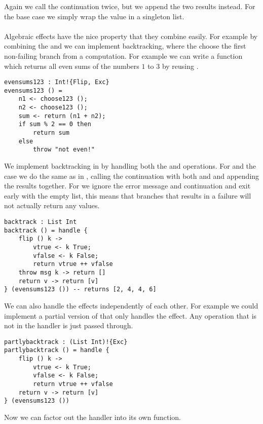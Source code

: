 {Again we call the continuation  twice, but we append the two results instead.
For the  base case we simply wrap the value in a singleton list.
\\\\
Algebraic effects have the nice property that they combine easily.
For example by combining the  and  we can implement backtracking, where the choose the first non-failing branch from a computation. For example we can write a function which returns all even sums of the numbers $1$ to $3$ by reusing .

\begin{verbatim}
evensums123 : Int!{Flip, Exc}
evensums123 () =
	n1 <- choose123 ();
	n2 <- choose123 ();
	sum <- return (n1 + n2);
	if sum % 2 == 0 then
		return sum
	else
		throw "not even!"
\end{verbatim}

We implement backtracking in  by handling both the  and  operations. For  and the  case we do the same as in , calling the continuation  with both  and  and appending the results together. For  we ignore the error message and continuation and exit early with the empty list, this means that branches that results in a failure will not actually return any values.

\begin{verbatim}
backtrack : List Int
backtrack () = handle {
	flip () k ->
		vtrue <- k True;
		vfalse <- k False;
		return vtrue ++ vfalse
	throw msg k -> return []
	return v -> return [v]
} (evensums123 ()) -- returns [2, 4, 4, 6]
\end{verbatim}

We can also handle the effects independently of each other. For example we could implement a partial version of  that only handles the  effect. Any operation that is not in the handler is just passed through.

\begin{verbatim}
partlybacktrack : (List Int)!{Exc}
partlybacktrack () = handle {
	flip () k ->
		vtrue <- k True;
		vfalse <- k False;
		return vtrue ++ vfalse
	return v -> return [v]
} (evensums123 ())
\end{verbatim}

Now we can factor out the  handler into its own function.

}
